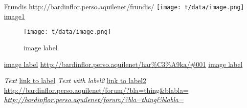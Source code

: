 \href{http://bardinflor.perso.aquilenet/frundis/}{Frundis}
\url{http://bardinflor.perso.aquilenet/frundis/}
\texttt{[image: t/data/image.png]}\hypertarget{label1}{}
\hyperlink{label1}{image1}

\begin{center}
\begin{figure}[htbp]
\texttt{[image: t/data/image.png]}
\caption{image label}
\label{fig:1}
\end{figure}
\end{center}
\hyperref[fig:1]{image label}
\url{http://bardinflor.perso.aquilenet/har\%C3\%A9ka/#001}
\hyperref[fig:1]{image label}

\hypertarget{label3}{}\emph{Text}
\hyperlink{label3}{link to label}
\hypertarget{label2}{}\emph{Text with label2}
\hyperlink{label2}{link to label2}
\url{http://bardinflor.perso.aquilenet/forum/?bla=thing&blabla=}
\emph{\url{http://bardinflor.perso.aquilenet/forum/?bla=thing&blabla=}}


